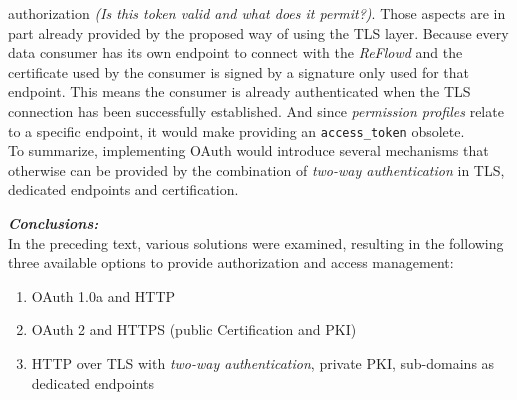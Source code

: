 \documentclass[12pt,english,a4paper,titlepage,cleardoublepage=empty,dottedtoc]{report}
\providecommand{\tightlist}{%
  \setlength{\itemsep}{0pt}\setlength{\parskip}{0pt}}
\begin{document}
authorization \emph{(Is this token valid and what does it permit?)}.
Those aspects are in part already provided by the proposed way of using
the TLS layer. Because every data consumer has its own endpoint to
connect with the \emph{ReFlowd} and the certificate used by the consumer
is signed by a signature only used for that endpoint. This means the
consumer is already authenticated when the TLS connection has been
successfully established. And since \emph{permission profiles} relate to
a specific endpoint, it would make providing an \texttt{access\_token}
obsolete.\\
To summarize, implementing OAuth would introduce several mechanisms that
otherwise can be provided by the combination of \emph{two-way
authentication} in TLS, dedicated endpoints and certification.

\emph{\textbf{Conclusions:}} ~\\
In the preceding text, various solutions were examined, resulting in the
following three available options to provide authorization and access
management:

\begin{enumerate}
\def\labelenumi{\alph{enumi})}
\tightlist
\item
  OAuth 1.0a and HTTP
\item
  OAuth 2 and HTTPS (public Certification and PKI)
\item
  HTTP over TLS with \emph{two-way authentication}, private PKI,
  sub-domains as dedicated endpoints
\end{enumerate}
\end{document}
